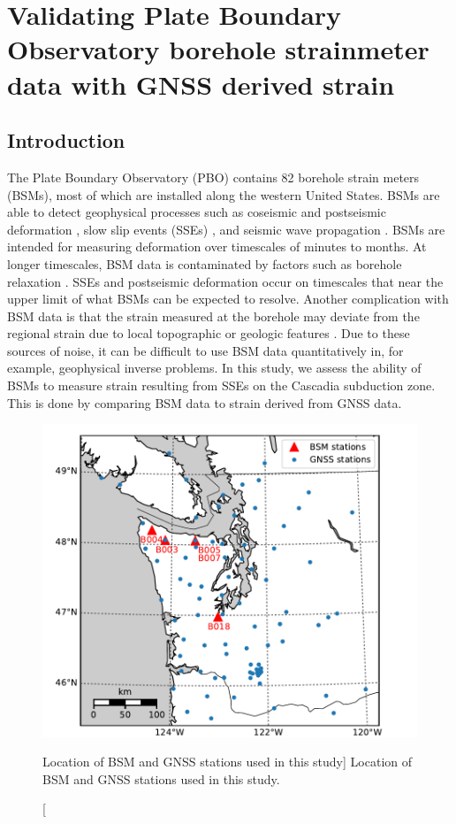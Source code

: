 \chapter{Validating Plate Boundary Observatory borehole
strainmeter data with GNSS derived strain}

\section{Introduction}
The Plate Boundary Observatory (PBO) contains 82 borehole strain
meters (BSMs), most of which are installed along the western United
States. BSMs are able to detect geophysical processes such as
coseismic and postseismic deformation
\citep[e.g.,][]{Langbein2006,Langbein2015}, slow slip events (SSEs)
\citep[e.g.,][]{Dragert2011}, and seismic wave propagation
\citep{Barbour2017}. BSMs are intended for measuring deformation over
timescales of minutes to months. At longer timescales, BSM data is
contaminated by factors such as borehole relaxation
\citep{Gladwin1987}. SSEs and postseismic deformation occur on
timescales that near the upper limit of what BSMs can be expected to
resolve. Another complication with BSM data is that the strain
measured at the borehole may deviate from the regional strain due to
local topographic or geologic features \citep{Berger1976}. Due to
these sources of noise, it can be difficult to use BSM data
quantitatively in, for example, geophysical inverse problems. In this
study, we assess the ability of BSMs to measure strain resulting from
SSEs on the Cascadia subduction zone. This is done by comparing BSM
data to strain derived from GNSS data.

\begin{figure}
\includegraphics{ch6/figures/map.pdf}
\caption
[Location of BSM and GNSS stations used in this study]
{Location of BSM and GNSS stations used in this study.}   
\label{ch6:fig:Map}
\end{figure}


